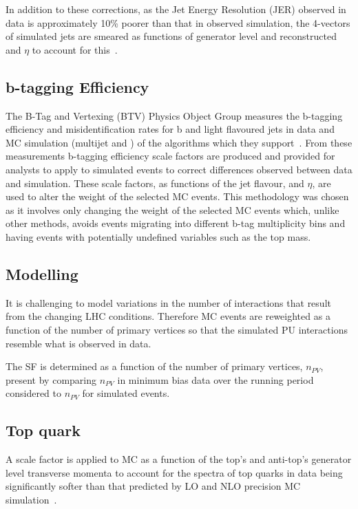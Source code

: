 In addition to these corrections, as the Jet Energy Resolution (JER) observed in data is approximately 10\% poorer than that in observed simulation, the 4-vectors of simulated jets are smeared as functions of generator level and reconstructed \pt and $\eta$ to account for this~\cite{Khachatryan:2016kdb}.

\subsection{b-tagging Efficiency}\label{subsec:btagEff}
The B-Tag and Vertexing (BTV) Physics Object Group measures the b-tagging efficiency and misidentification rates for b and light flavoured jets in data and MC simulation (multijet and \ttbar) of the algorithms which they support~\cite{Sirunyan:2017ezt}.
From these measurements b-tagging efficiency scale factors are produced and provided for analysts to apply to simulated events to correct differences observed between data and simulation.
These scale factors, as functions of the jet flavour, \pT and $\eta$, are used to alter the weight of the selected MC events.
This methodology was chosen as it involves only changing the weight of the selected MC events which, unlike other methods, avoids events migrating into different b-tag multiplicity bins and having events with potentially undefined variables such as the top mass.

\subsection{\PU Modelling}\label{subsec:puSF}
It is challenging to model variations in the number of \PU interactions that result from the changing LHC conditions.
Therefore MC events are reweighted as a function of the number of primary vertices so that the simulated PU interactions resemble what is observed in data.

The \PU SF is determined as a function of the number of primary vertices, $n_{PV}$, present by comparing $n_{PV}$ in minimum bias data over the running period considered to $n_{PV}$ for simulated events.

\subsection{Top quark \pt}
A scale factor is applied to \ttbar MC as a function of the top's and anti-top's generator level transverse momenta to account for the \pt spectra of top quarks in data being significantly softer than that predicted by LO and NLO precision MC simulation~\cite{Khachatryan:2015oqa}.


